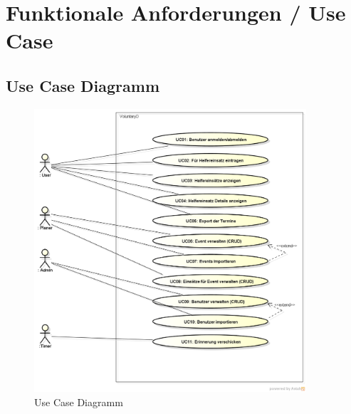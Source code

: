 \chapter{Funktionale Anforderungen / Use Case}

	\section{Use Case Diagramm}    
    \begin{figure}[h]
    	\centering
    	\includegraphics[width=0.9\textwidth]{content/anforderungsspezifikation/images/usecase_diagram.png}
    	\caption{Use Case Diagramm}
	\end{figure}